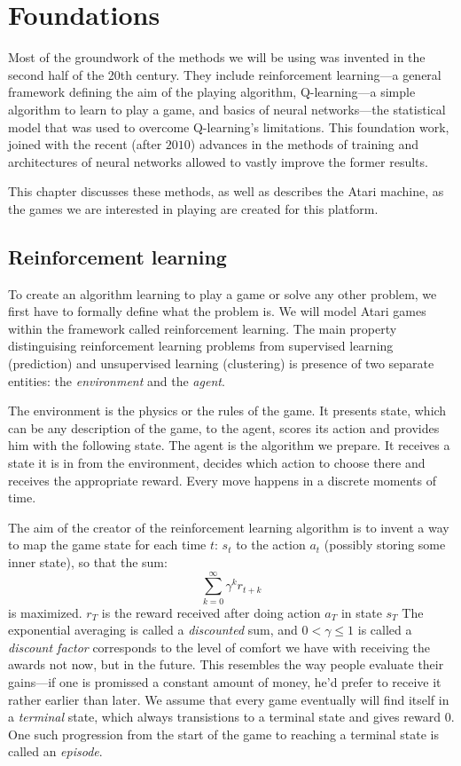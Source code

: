 \chapter{Foundations}\label{foundations}
Most of the groundwork of the methods we will be using was invented in the second half of the 20th century. They include reinforcement learning---a general framework defining the aim of the playing algorithm, Q-learning---a simple algorithm to learn to play a game, and basics of neural networks---the statistical model that was used to overcome Q-learning's limitations.
This foundation work, joined with the recent (after $2010$) advances in the methods of training and architectures of neural networks allowed to vastly improve the former results.

This chapter discusses these methods, as well as describes the Atari machine, as the games we are interested in playing are created for this platform.

\section{Reinforcement learning}
To create an algorithm learning to play a game or solve any other problem, we first have to formally define what the problem is. We will model Atari games within the framework called reinforcement learning. The main property distinguising reinforcement learning problems from supervised learning (prediction) and unsupervised learning (clustering) is presence of two separate entities: the \emph{environment} and the \emph{agent}.

The environment is the physics or the rules of the game. It presents state, which can be any description of the game, to the agent, scores its action and provides him with the following state.
The agent is the algorithm we prepare. It receives a state it is in from the environment, decides which action to choose there and receives the appropriate reward. Every move happens in a discrete moments of time.

The aim of the creator of the reinforcement learning algorithm is to invent a way to map the game state for each time $t$: $s_t$ to the action $a_t$ (possibly storing some inner state), so that the sum:
\begin{equation} \label{discounted-reward}
\sum_{k=0}^{\infty} \gamma^k r_{t + k}
\end{equation}
is maximized. $r_T$ is the reward received after doing action $a_T$ in state $s_T$ The exponential averaging is called a \emph{discounted} sum, and $0 < \gamma \le 1$ is called a \emph{discount factor} corresponds to the level of comfort we have with receiving the awards not now, but in the future. This resembles the way people evaluate their gains---if one is promissed a constant amount of money, he'd prefer to receive it rather earlier than later. We assume that every game eventually will find itself in a \emph{terminal} state, which always transistions to a terminal state and gives reward $0$. One such progression from the start of the game to reaching a terminal state is called an \emph{episode}.


